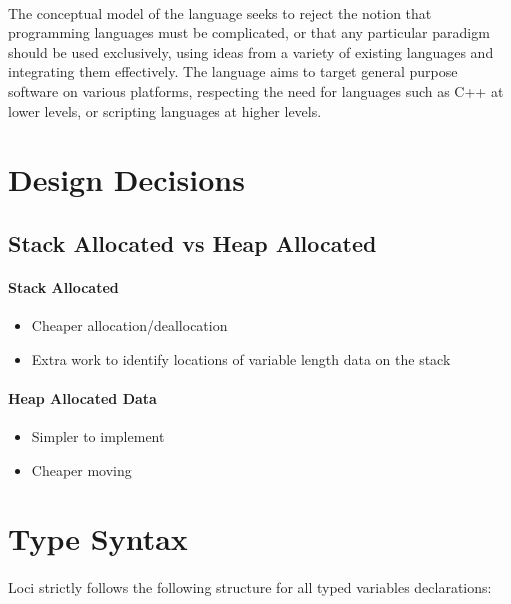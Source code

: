 \documentclass[12pt,twoside,notitlepage]{report}
\begin{document}
\paragraph{}
The conceptual model of the language seeks to reject the notion that programming languages must be complicated, or that any particular paradigm should be used exclusively, using ideas from a variety of existing languages and integrating them effectively. The language aims to target general purpose software on various platforms, respecting the need for languages such as C++ at lower levels, or scripting languages at higher levels.

\section{Design Decisions}

\subsection{Stack Allocated vs Heap Allocated}

\paragraph{Stack Allocated}
\begin{itemize}
\item Cheaper allocation/deallocation
\item Extra work to identify locations of variable length data on the stack
\end{itemize}

\paragraph{Heap Allocated Data}
\begin{itemize}
\item Simpler to implement
\item Cheaper moving
\end{itemize}

\section{Type Syntax}

\paragraph{}
Loci strictly follows the following structure for all typed variables declarations:
\end{document}
